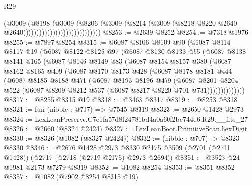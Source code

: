 \begin{lexlean}{R29}
\begin{coremodule}
                                              (@3009
                                                (@8198
                                                  (@3009
                                                    (@8206
                                                      (@3009
                                                        (@8214
                                                          (@3009
                                                            (@8218
                                                              @8220
                                                              @2640
                                                              @2640)))))))))))))))))))))))))))))
@8253 := @2639 @8252
@8254 := @7318 @1976
@8255 := @7897 @8254
@8315 := @6087
    @8106
    @8109
    @90
    (@6087
      @8114
      @8117
      @19
      (@6087
        @8122
        @8125
        @97
        (@6087
          @8130
          @8133
          @55
          (@6087
            @8138
            @8141
            @165
            (@6087
              @8146
              @8149
              @83
              (@6087
                @8154
                @8157
                @380
                (@6087
                  @8162
                  @8165
                  @409
                  (@6087
                    @8170
                    @8173
                    @428
                    (@6087
                      @8178
                      @8181
                      @444
                      (@6087
                        @8185
                        @8188
                        @471
                        (@6087
                          @8193
                          @8196
                          @479
                          (@6087
                            @8201
                            @8204
                            @522
                            (@6087 @8209 @8212 @537 (@6087 @8217 @8220 @701 @731))))))))))))))
@8317 := @8255 @8315 @19
@8318 := @3463 @8317
@8319 := @8253 @8318
@8321 := fun (nibble : @707) => @7545 @8319
@8323 := @2650 @1428 @2973
@8324 := LexLeanPreserve.C7e1fa57d8f24781bd4a0a60f2bc744d6.R29.__fits_27
@8326 := @2660 (@8324 @2424)
@8327 := LexLeanBoot.PrimitiveScan.hexDigit
@8330 := @8326 (@1082 (@8327 @2424))
@8332 := (nibble : @707) -> @8323 @8330
@8346 := @2676
    @1428
    @2973
    @8330
    @2175
    @3509
    (@2701 (@2711 @1428))
    (@2717 (@2718 (@2719 @2175) @2973 @2694))
@8351 := @3523 @24 @1981 @2173 @7279 @8319
@8352 := @1082 @8254
@8353 := @8351 @8352
@8357 := @1082 (@7902 @8254 @8315 @19)

\end{coremodule}
\end{lexlean}
